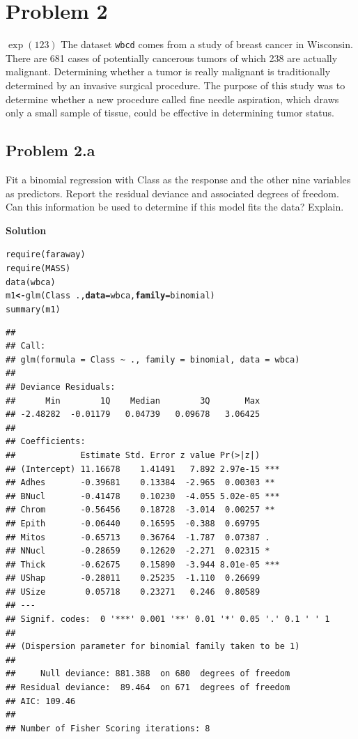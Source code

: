 \documentclass[12pt,oneside,a4paper]{article}\usepackage[]{graphicx}\usepackage[]{xcolor}
\title{\hmwkTitle}
\author{\hmwkAuthorName}
\date{\today}
\makeatletter
\newcommand{\hlopt}[1]{\textcolor[rgb]{0,0,0}{#1}}%
\newcommand{\hlstd}[1]{\textcolor[rgb]{0,0,0}{#1}}%
\newcommand{\hlkwb}[1]{\textcolor[rgb]{0.498,0,0.333}{\textbf{#1}}}%
\newcommand{\hlkwc}[1]{\textcolor[rgb]{0.498,0,0.333}{\textbf{#1}}}%
\newcommand{\hlkwd}[1]{\textcolor[rgb]{0,0,0}{#1}}%
\newenvironment{kframe}{%
 \def\at@end@of@kframe{}%
 \ifinner\ifhmode%
  \def\at@end@of@kframe{\end{minipage}}%
  \begin{minipage}{\columnwidth}%
 \fi\fi%
 \def\FrameCommand##1{\hskip\@totalleftmargin \hskip-\fboxsep
 \colorbox{shadecolor}{##1}\hskip-\fboxsep
     \hskip-\linewidth \hskip-\@totalleftmargin \hskip\columnwidth}%
 \MakeFramed {\advance\hsize-\width
   \@totalleftmargin\z@ \linewidth\hsize
   \@setminipage}}%
 {\par\unskip\endMakeFramed%
 \at@end@of@kframe}
\newenvironment{knitrout}{}{} %
\newcommand{\problem}[1]
{
    \clearpage
    \section*{Problem {#1}}
}
\newcommand{\subproblem}[1]
{
    \subsection*{Problem {#1}}
}
\newcommand{\solution}
{
    \vspace{15pt}
    \noindent\ignorespaces\textbf{\large Solution}\par
}
\newcommand{\m}[1]{\texttt{{#1}}}
\makeatother
\begin{document}
\maketitle



\problem{2}
$\exp(123)$
The dataset \m{wbcd} comes from a study of breast cancer in Wisconsin. There are 681 cases of potentially cancerous tumors of which 238 are actually malignant. Determining whether a tumor is really malignant is traditionally determined by an invasive surgical procedure. The purpose of this study was to determine whether a new procedure called fine needle aspiration, which draws only a small sample of tissue, could be effective in determining tumor status.

\subproblem{2.a}
Fit a binomial regression with Class as the response and the other nine variables as predictors. Report the residual deviance and associated degrees of freedom. Can this information be used to determine if this model fits the data? Explain.

\solution
\begin{knitrout}
\color{fgcolor}\begin{kframe}
\begin{alltt}
\hlkwd{require}\hlstd{(faraway)}
\hlkwd{require}\hlstd{(MASS)}
\hlkwd{data}\hlstd{(wbca)}
\hlstd{m1} \hlkwb{<-} \hlkwd{glm}\hlstd{(Class} \hlopt{~} \hlstd{.,} \hlkwc{data} \hlstd{= wbca,} \hlkwc{family} \hlstd{= binomial)}
\hlkwd{summary}\hlstd{(m1)}
\end{alltt}
\begin{verbatim}
## 
## Call:
## glm(formula = Class ~ ., family = binomial, data = wbca)
## 
## Deviance Residuals: 
##      Min        1Q    Median        3Q       Max  
## -2.48282  -0.01179   0.04739   0.09678   3.06425  
## 
## Coefficients:
##             Estimate Std. Error z value Pr(>|z|)    
## (Intercept) 11.16678    1.41491   7.892 2.97e-15 ***
## Adhes       -0.39681    0.13384  -2.965  0.00303 ** 
## BNucl       -0.41478    0.10230  -4.055 5.02e-05 ***
## Chrom       -0.56456    0.18728  -3.014  0.00257 ** 
## Epith       -0.06440    0.16595  -0.388  0.69795    
## Mitos       -0.65713    0.36764  -1.787  0.07387 .  
## NNucl       -0.28659    0.12620  -2.271  0.02315 *  
## Thick       -0.62675    0.15890  -3.944 8.01e-05 ***
## UShap       -0.28011    0.25235  -1.110  0.26699    
## USize        0.05718    0.23271   0.246  0.80589    
## ---
## Signif. codes:  0 '***' 0.001 '**' 0.01 '*' 0.05 '.' 0.1 ' ' 1
## 
## (Dispersion parameter for binomial family taken to be 1)
## 
##     Null deviance: 881.388  on 680  degrees of freedom
## Residual deviance:  89.464  on 671  degrees of freedom
## AIC: 109.46
## 
## Number of Fisher Scoring iterations: 8
\end{verbatim}
\end{kframe}
\end{knitrout}
\end{document}
